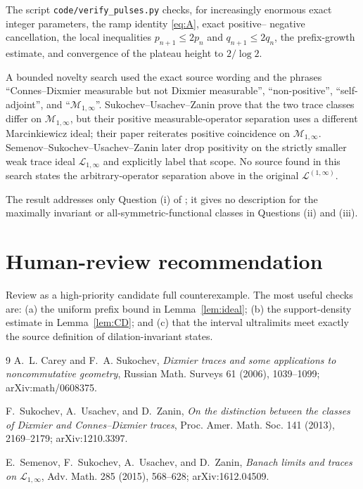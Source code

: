 \documentclass[11pt]{article}
\newcommand{\Mideal}{\mathcal L^{(1,\infty)}}
\begin{document}
The script \texttt{code/verify\_pulses.py} checks, for increasingly enormous
exact integer parameters, the ramp identity \eqref{eq:A}, exact positive--
negative cancellation, the local inequalities $p_{n+1}\le2p_n$ and
$q_{n+1}\le2q_n$, the prefix-growth estimate, and convergence of the plateau
height to $2/\log2$.

A bounded novelty search used the exact source wording and the phrases
``Connes--Dixmier measurable but not Dixmier measurable'', ``non-positive'',
``self-adjoint'', and ``$\mathcal M_{1,\infty}$''.  Sukochev--Usachev--Zanin
\cite{SUZ} prove that the two trace classes differ on
$\mathcal M_{1,\infty}$, but their positive measurable-operator separation
uses a different Marcinkiewicz ideal; their paper reiterates positive
coincidence on $\mathcal M_{1,\infty}$.  Semenov--Sukochev--Usachev--Zanin
\cite[Theorem~7.7]{SSUZ} later drop positivity on the strictly smaller weak
trace ideal $\mathcal L_{1,\infty}$ and explicitly label that scope.  No source
found in this search states the arbitrary-operator separation above in the
original $\Mideal$.

The result addresses only Question (i) of \cite{CS}; it gives no description
for the maximally invariant or all-symmetric-functional classes in Questions
(ii) and (iii).

\section{Human-review recommendation}

Review as a high-priority candidate full counterexample.  The most useful
checks are: (a) the uniform prefix bound in Lemma~\ref{lem:ideal}; (b) the
support-density estimate in Lemma~\ref{lem:CD}; and (c) that the interval
ultralimits meet exactly the source definition of dilation-invariant states.

\begin{thebibliography}{9}
A.~L. Carey and F.~A. Sukochev,
\emph{Dixmier traces and some applications to noncommutative geometry},
Russian Math. Surveys 61 (2006), 1039--1099; arXiv:math/0608375.

F.~Sukochev, A.~Usachev, and D.~Zanin,
\emph{On the distinction between the classes of Dixmier and
Connes--Dixmier traces},
Proc. Amer. Math. Soc. 141 (2013), 2169--2179; arXiv:1210.3397.

E.~Semenov, F.~Sukochev, A.~Usachev, and D.~Zanin,
\emph{Banach limits and traces on $\mathcal L_{1,\infty}$},
Adv. Math. 285 (2015), 568--628; arXiv:1612.04509.
\end{thebibliography}
\end{document}
